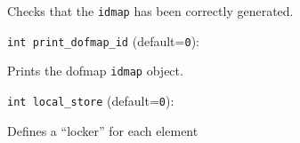 Checks that the \verb+idmap+ has been correctly generated. 

\item\verb+int print_dofmap_id+ {\rm(default=\verb|0|)}:

Prints the dofmap \verb+idmap+ object. 

\item\verb+int local_store+ {\rm(default=\verb|0|)}:

Defines a ``locker'' for each element


